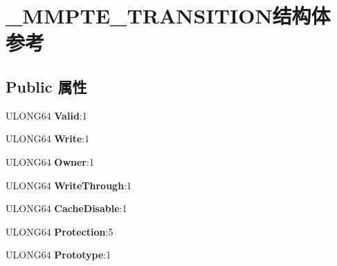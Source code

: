 \hypertarget{struct___m_m_p_t_e___t_r_a_n_s_i_t_i_o_n}{}\section{\+\_\+\+M\+M\+P\+T\+E\+\_\+\+T\+R\+A\+N\+S\+I\+T\+I\+O\+N结构体 参考}
\label{struct___m_m_p_t_e___t_r_a_n_s_i_t_i_o_n}
\subsection*{Public 属性}
\begin{DoxyCompactItemize}
\item 
\mbox{\label{struct___m_m_p_t_e___t_r_a_n_s_i_t_i_o_n_adfb2c68d29961b7226f1039a7d7b895d}} 
U\+L\+O\+N\+G64 {\bfseries Valid}\+:1
\item 
\mbox{\label{struct___m_m_p_t_e___t_r_a_n_s_i_t_i_o_n_aa70c7e1425ebe0ccbd7d43131eff16c8}} 
U\+L\+O\+N\+G64 {\bfseries Write}\+:1
\item 
\mbox{\label{struct___m_m_p_t_e___t_r_a_n_s_i_t_i_o_n_a5e7acb7d0f2345bc2b609604310fe2bf}} 
U\+L\+O\+N\+G64 {\bfseries Owner}\+:1
\item 
\mbox{\label{struct___m_m_p_t_e___t_r_a_n_s_i_t_i_o_n_a0e973df7e857505bcd528607e431a6a9}} 
U\+L\+O\+N\+G64 {\bfseries Write\+Through}\+:1
\item 
\mbox{\label{struct___m_m_p_t_e___t_r_a_n_s_i_t_i_o_n_a9ee44d4694d3792e0f8a79ebc60deb8d}} 
U\+L\+O\+N\+G64 {\bfseries Cache\+Disable}\+:1
\item 
\mbox{\label{struct___m_m_p_t_e___t_r_a_n_s_i_t_i_o_n_a1f183c21a6f1446b14d631ff7d8f3e53}} 
U\+L\+O\+N\+G64 {\bfseries Protection}\+:5
\item 
\mbox{\label{struct___m_m_p_t_e___t_r_a_n_s_i_t_i_o_n_a61f53b19f0d951394b4d202ddd722bc7}} 
U\+L\+O\+N\+G64 {\bfseries Prototype}\+:1
\item 

\end{DoxyCompactItemize}
